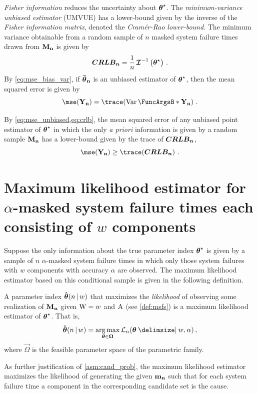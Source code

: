 \documentclass[
    11pt,
    extrafontsizes,
    article,
    oldfontcommands,
    final,
    oneside,
    openany,
    hidelinks]{memoir}
\begin{document}
\emph{Fisher information} reduces the uncertainty about ${\boldsymbol{\mathbf{\theta}}}^{\star}$.
The \emph{minimum-variance unbiased estimator} (UMVUE) has a lower-bound given by the inverse of the \emph{Fisher information matrix}, denoted the \emph{Cram\'{e}r-Rao lower-bound}.
The minimum variance obtainable from a random sample of $n$ masked system failure times drawn from $\boldsymbol{\mathbf{M_n}}$ is given by
\begin{equation}
\label{eq:crlb}
    \boldsymbol{CRLB_n} = \frac{1}{n} \operatorname{\boldsymbol{\mathcal{I}}}^{-1}\left({\boldsymbol{\mathbf{\theta}}}^{\star} 
    \right)\,.
\end{equation}
By \cref{eq:mse_bias_var}, if $\boldsymbol{\mathbf{\bar{\boldsymbol{\mathbf{\theta}}}_{n}}}$ is an unbiased estimator of ${\boldsymbol{\mathbf{\theta}}}^{\star}$, then the mean squared error is given by
\begin{equation}
\label{eq:mse_unbiased}
\mse(\sampdpt) = \trace\!\left( \Var{\sampdpt}\right)\,.
\end{equation}

By \cref{eq:mse_unbiased,eq:crlb}, the mean squared error of any unbiased point 
estimator of ${\boldsymbol{\mathbf{\theta}}}^{\star}$ in which the only \emph{a priori} 
information is given by a random sample $\boldsymbol{\mathbf{M_n}}$ has a lower-bound given by the 
trace of $\boldsymbol{CRLB_n}$,
\begin{equation}
\label{eq:mse_lower_bound_total}
\mse(\sampdpt) \geq \trace\!\left(\matrx{CRLB_n}\right)\,.
\end{equation}

\section{Maximum likelihood estimator for $\alpha$-masked system failure times each consisting of $w$ components}
Suppose the only information about the true parameter index ${\boldsymbol{\mathbf{\theta}}}^{\star}$ is given by a sample of $n$ $\alpha$-masked system failure times in which only those system failures with $w$ components with accuracy $\alpha$ are observed.
The maximum likelihood estimator based on this conditional sample is given in the following definition.
\begin{definition}
\label{def:general_mle}
A parameter index $\boldsymbol{\mathbf{\hat{\boldsymbol{\mathbf{\theta}}}}}(n {\,|\,} w)$ that maximizes the \emph{likelihood} of observing some realization of $\boldsymbol{\mathbf{M_n}}$ given $\mathrm{W} = w$ and $\mathrm{A}$ (see \cref{def:msfs}) is a maximum likelihood estimator of ${\boldsymbol{\mathbf{\theta}}}^{\star}$.
That is,
\begin{equation}
\label{eq:general_mle}
\mle = \argmax_{\sysparamvec \in \vec\Omega} \likelihood_n(\sysparamvec \Given w, \alpha)\,,
\end{equation}
where $\vec\Omega$ is the feasible parameter space of the parametric family.
\end{definition}
As further justification of \cref{asm:cand_prob}, the maximum likelihood estimator maximizes the likelihood of generating the given $\boldsymbol{\mathbf{m_n}}$ such that for each system failure time a component in the corresponding candidate set is the cause.
\end{document}
